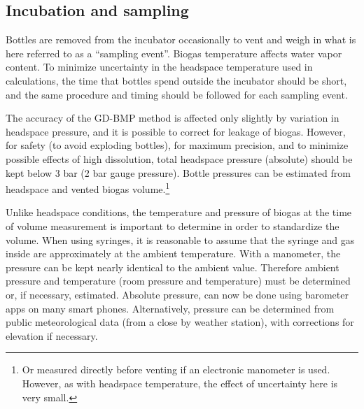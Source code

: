 \documentclass[]{article}
\begin{document}
\subsection{Incubation and sampling}
Bottles are removed from the incubator occasionally to vent and weigh in what is here referred to as a ``sampling event''. 
Biogas temperature affects water vapor content. 
To minimize uncertainty in the headspace temperature used in calculations, the time that bottles spend outside the incubator should be short, and the same procedure and timing should be followed for each sampling event. 

The accuracy of the GD-BMP method is affected only slightly by variation in headspace pressure, and it is possible to correct for leakage of biogas. 
However, for safety (to avoid exploding bottles), for maximum precision, and to minimize possible effects of high  dissolution, total headspace pressure (absolute) should be kept below 3 bar (2 bar gauge pressure). 
Bottle pressures can be estimated from headspace and vented biogas volume.\footnote{
  Or measured directly before venting if an electronic manometer is used.
  However, as with headspace temperature, the effect of uncertainty here is very small.
}

Unlike headspace conditions, the temperature and pressure of biogas at the time of volume measurement is important to determine in order to standardize the volume.
When using syringes, it is reasonable to assume that the syringe and gas inside are approximately at the ambient temperature.
With a manometer, the pressure can be kept nearly identical to the ambient value.
Therefore ambient pressure and temperature (room pressure and temperature) must be determined or, if necessary, estimated.
Absolute pressure, can now be done using barometer apps on many smart phones.
Alternatively, pressure can be determined from public meteorological data (from a close by weather station), with corrections for elevation if necessary.
\end{document}
